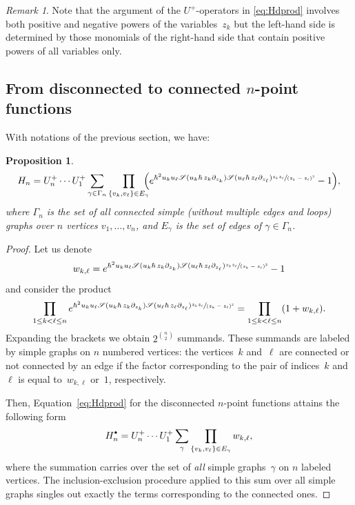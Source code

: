 \documentclass[JEP,XML,SOM,Unicode,NoEqCountersInSection,NoFloatCountersInSection]{cedram}
\let\mathcal\mathscr
\newcommand{\sbullet}{{\scriptscriptstyle\bullet}}
\newcommand{\csbullet}{{\raisebox{1pt}{$\sbullet$}}}
\theoremstyle{plain}
\newtheorem{proposition}[theorem]{Proposition}
\theoremstyle{definition}
\theoremstyle{remark}
\newtheorem{remark}[theorem]{Remark}
\newcommand{\cS}{\mathcal{S}}
\newcommand{\Hd}{H^\csbullet}
\begin{document}
\begin{remark}
Note that the argument of the $U^+$-operators in \eqref{eq:Hdprod} involves both positive and negative powers of the variables~$z_k$ but the left-hand side is determined by those monomials of the right-hand side that contain positive powers of all variables only.
\end{remark}

\subsection{From disconnected to connected \texorpdfstring{$n$}{n}-point functions}

With notations of the previous section, we have:
\skpt
\begin{proposition}\label{prop:Hnconn}\mbox{}\vspace*{-\baselineskip}
\begin{equation}\label{eq:Hnconn}
H_n
=U^+_n\cdots U^+_1
\sum_{\gamma \in \Gamma_n}\prod_{\{v_k,v_\ell\}\in E_\gamma}\hspace*{-2mm}
\Bigl(e^{\hbar^2u_ku_\ell\cS(u_k\hbar\,z_k\partial_{z_k})\cS(u_\ell\hbar\,z_\ell\partial_{z_\ell})
\sfrac{z_k z_\ell}{(z_k-z_\ell)^2}}-1\Bigr),
\end{equation}
where $\Gamma_n$ is the set of all connected simple (\ie without multiple edges and loops) graphs over $n$ vertices $v_1,\ldots,v_n$, and $E_\gamma$ is the set of edges of $\gamma \in \Gamma_n$.
\end{proposition}

\begin{proof}
Let us denote
\begin{equation*}
w_{k,\ell}=
e^{\hbar^2u_ku_\ell\cS(u_k\hbar\,z_k\partial_{z_k})\cS(u_\ell\hbar\,z_\ell\partial_{z_\ell})
\sfrac{z_k z_\ell}{(z_k-z_\ell)^2}}-1
\end{equation*}
and consider the product
\begin{equation*}
\prod_{1\le k<\ell\le n}
e^{\hbar^2u_ku_\ell\cS(u_k\hbar\,z_k\partial_{z_k})\cS(u_\ell\hbar\,z_\ell\partial_{z_\ell})
\sfrac{z_k z_\ell}{(z_k-z_\ell)^2}}
=\prod_{1\le k<\ell\le n}
(1+w_{k,\ell}).
\end{equation*}
Expanding the brackets we obtain $2^{\binom{n}{2}}$ summands. These summands are labeled by simple graphs on $n$ numbered vertices: the vertices~$k$ and~$\ell$ are connected or not connected by an edge if the factor corresponding to the pair of indices~$k$ and~$\ell$ is equal to~$w_{k,\ell}$ or~$1$, respectively.

Then, Equation~\eqref{eq:Hdprod} for the disconnected $n$-point functions attains the following form
\begin{equation*}
\Hd_n=U^+_n\cdots U^+_1
\sum_{\gamma}\prod_{\{v_k,v_\ell\}\in E_\gamma} w_{k,\ell},
\end{equation*}
where the summation carries over the set of \emph{all} simple graphs~$\gamma$ on $n$ labeled vertices. The inclusion-exclusion procedure applied to this sum over all simple graphs singles out exactly the terms corresponding to the connected ones.
\end{proof}
\end{document}
